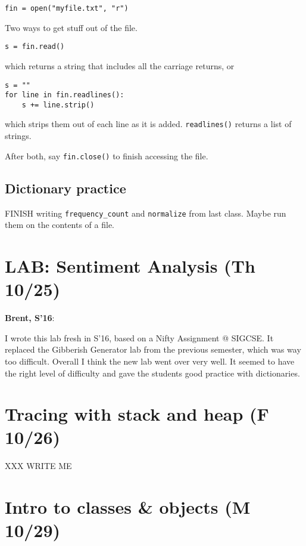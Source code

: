 \documentclass{article}
\newenvironment{reflect}[1]
{
  \noindent
  \begin{lrbox}{\reflectbox}
    \begin{minipage}[t]{\textwidth}
      \textbf{#1}:
}{
    \end{minipage}
  \end{lrbox}
  \fbox{\usebox{\reflectbox}}
}
\begin{document}
\begin{verbatim}
fin = open("myfile.txt", "r")
\end{verbatim}

Two ways to get stuff out of the file.

\begin{verbatim}
s = fin.read()
\end{verbatim}

which returns a string that includes all the carriage returns, or

\begin{verbatim}
s = ""
for line in fin.readlines():
    s += line.strip()
\end{verbatim}

which strips them out of each line as it is added. \verb|readlines()|
returns a list of strings.

After both, say \verb|fin.close()| to finish accessing the file.

\subsection*{Dictionary practice}

FINISH writing \verb|frequency_count| and \verb|normalize| from last
class.  Maybe run them on the contents of a file.

\newpage
\section*{LAB: Sentiment Analysis (Th 10/25)}

\begin{reflect}{Brent, S'16}
  I wrote this lab fresh in S'16, based on a Nifty Assignment @
  SIGCSE.  It replaced the Gibberish Generator lab from the previous
  semester, which was way too difficult.  Overall I think the new lab
  went over very well.  It seemed to have the right level of
  difficulty and gave the students good practice with dictionaries.
\end{reflect}

\newpage
\section{Tracing with stack and heap (F 10/26)}

XXX WRITE ME

\newpage
\section{Intro to classes \& objects (M 10/29)}
\end{document}
